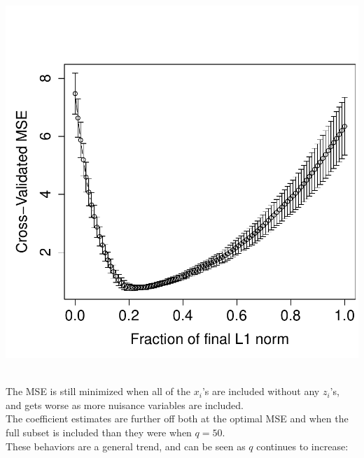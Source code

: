 \documentclass[a4paper]{article}
\begin{document}
\begin{minipage}[c]{0.6\linewidth}
\includegraphics{h4_ind-010}
\end{minipage}\\
The MSE is still minimized when all of the $x_i$'s are included without any
$z_i$'s, and gets worse as more nuisance variables are included.\\

The coefficient estimates are further off both at the optimal MSE and
when the full subset is included than they were when $q=50$.\\

These behaviors are a general trend, and can be seen as $q$ continues
to increase:\\
\end{document}
